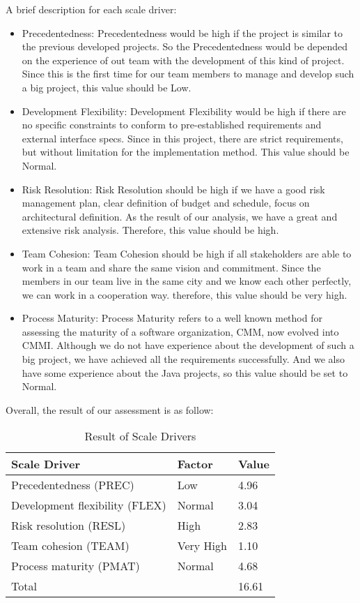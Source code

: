 \documentclass{article}
\begin{document}
\begin{table}[H]
\begin{tabular}{@{}|l|l|l|l|l|l|l|@{}}
		\hline
		\end{tabular}
	\end{table}
	A brief description for each scale driver:
	\begin{itemize}
		\item Precedentedness: Precedentedness would be high if the project is similar to the previous developed projects. So the Precedentedness would be depended on the experience of out team with the development of this kind of project. Since this is the first time for our team members to manage and develop such a big project, this value should be Low.
		\item Development Flexibility: Development Flexibility would be high if there are no specific constraints to conform to pre-established requirements and external interface specs. Since in this project, there are strict requirements, but without limitation for the implementation method. This value should be Normal.
		\item Risk Resolution: Risk Resolution should be high if we have a good risk management plan, clear definition of budget and schedule, focus on architectural definition. As the result of our analysis, we have a great and extensive risk analysis. Therefore, this value should be high.
		\item Team Cohesion: Team Cohesion should be high if all stakeholders are able to work in a team and share the same vision and commitment. Since the members in our team live in the same city and we know each other perfectly, we can work in a cooperation way. therefore, this value should be very high.
		\item Process Maturity: Process Maturity refers to a well known method for assessing the maturity of a software organization, CMM, now evolved into CMMI. Although we do not have experience about the development of such a big project, we have achieved all the requirements successfully. And we also have some experience about the Java projects, so this value should be set to Normal.
	\end{itemize}
	Overall, the result of our assessment is as follow:
	\begin{table}[H]
		\centering
		\caption{Result of Scale Drivers}
		\label{my-label}
		\begin{tabular}{|l|l|l|}
			\hline
			Scale Driver                       & Factor    & Value \\ \hline
			Precedentedness (PREC)   & Low       & 4.96   \\ \hline
			Development flexibility (FLEX)  & Normal       & 3.04   \\ \hline
			Risk resolution (RESL) & High       & 2.83   \\ \hline
			Team cohesion (TEAM)  & Very High      & 1.10   \\ \hline
			Process maturity (PMAT)      & Normal    & 4.68 \\ \hline
			\multicolumn{2}{|l|}{Total}                    & 16.61  \\ \hline
		\end{tabular}
	\end{table}
	\newpage
\end{document}
